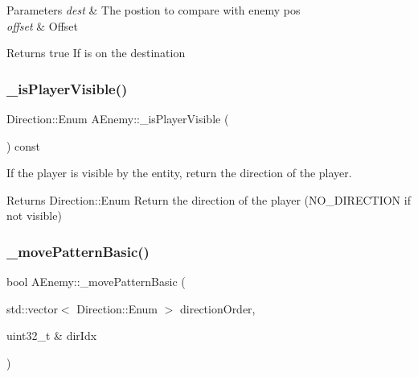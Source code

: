 \begin{DoxyParams}{Parameters}
{\em dest} & The postion to compare with enemy pos \\
\hline
{\em offset} & Offset \\
\hline
\end{DoxyParams}
\begin{DoxyReturn}{Returns}
true If is on the destination 
\end{DoxyReturn}
\mbox{\label{class_a_enemy_a7909b6882d5dba58d147decadc256cba}} 
\subsubsection{\texorpdfstring{\+\_\+is\+Player\+Visible()}{\_isPlayerVisible()}}
{\footnotesize\ttfamily Direction\+::\+Enum A\+Enemy\+::\+\_\+is\+Player\+Visible (\begin{DoxyParamCaption}{ }\end{DoxyParamCaption}) const\hspace{0.3cm}{\ttfamily [protected]}}



If the player is visible by the entity, return the direction of the player. 

\begin{DoxyReturn}{Returns}
Direction\+::\+Enum Return the direction of the player (N\+O\+\_\+\+D\+I\+R\+E\+C\+T\+I\+ON if not visible) 
\end{DoxyReturn}
\mbox{\label{class_a_enemy_a2ddbe01e55094dbbff085ff10b1db957}} 
\subsubsection{\texorpdfstring{\+\_\+move\+Pattern\+Basic()}{\_movePatternBasic()}}
{\footnotesize\ttfamily bool A\+Enemy\+::\+\_\+move\+Pattern\+Basic (\begin{DoxyParamCaption}\item[{std\+::vector$<$ Direction\+::\+Enum $>$}]{direction\+Order,  }\item[{uint32\+\_\+t \&}]{dir\+Idx }\end{DoxyParamCaption})\hspace{0.3cm}{\ttfamily [protected]}}



